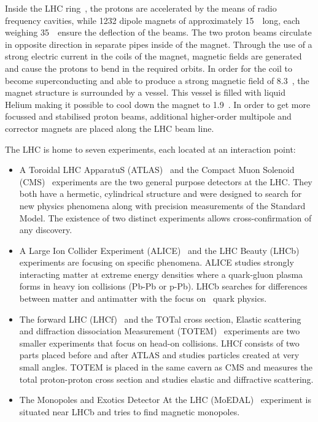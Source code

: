 Inside the LHC ring~\cite{Bruning:782076}, the protons are accelerated by the means of radio frequency cavities, while 1232 dipole magnets of approximately 15~\m\ long, each weighing 35~\tonne\, ensure the deflection of the beams.  The two proton beams circulate in opposite direction in separate pipes inside of the magnet. Through the use of a strong electric current in the coils of the magnet, magnetic fields are generated and cause the protons to bend in the required orbits. In order for the coil to become superconducting and able to produce a strong magnetic field of 8.3~\tesla, the magnet structure is surrounded by a vessel. This vessel is filled with liquid Helium making it possible to cool down the magnet to 1.9~\kelvin. In order to get more focussed and stabilised proton beams, additional higher-order multipole and corrector magnets are placed along the LHC beam line.

  

The LHC is home to seven experiments, each located at an interaction point: 
\begin{itemize}
	\item A Toroidal LHC ApparatuS (ATLAS)~\cite{Aad:2008zzm} and the Compact Muon Solenoid (CMS)~\cite{Chatrchyan:2008aa} experiments are the two general purpose detectors at the LHC. They both have a hermetic, cylindrical structure and were designed to search for new physics phenomena along with precision measurements of the Standard Model. The existence of two distinct experiments allows cross-confirmation of any discovery. 
	\item A Large Ion Collider Experiment (ALICE)~\cite{Aamodt:2008zz} and the LHC Beauty (LHCb)~\cite{Alves:2008zz} experiments are focusing on specific phenomena. ALICE studies strongly interacting matter at extreme energy densities where a quark-gluon plasma forms in heavy ion collisions (Pb-Pb or p-Pb). LHCb searches for differences between matter and antimatter with the focus on \Pbottom\ quark physics.
	\item The forward LHC (LHCf)~\cite{Bongi:2010zz} and the TOTal cross section, Elastic scattering and diffraction dissociation Measurement (TOTEM)~\cite{Anelli:2008zza} experiments are two smaller experiments that focus on head-on collisions. LHCf consists of two parts placed before and after ATLAS and studies particles created at very small angles. TOTEM is placed in the same cavern as CMS and measures the total proton-proton cross section and studies elastic and diffractive scattering.  
		\item The Monopoles and Exotics Detector At the LHC (MoEDAL)~\cite{Acharya:2014nyr} experiment is situated near LHCb and tries to find magnetic monopoles. 
\end{itemize}




